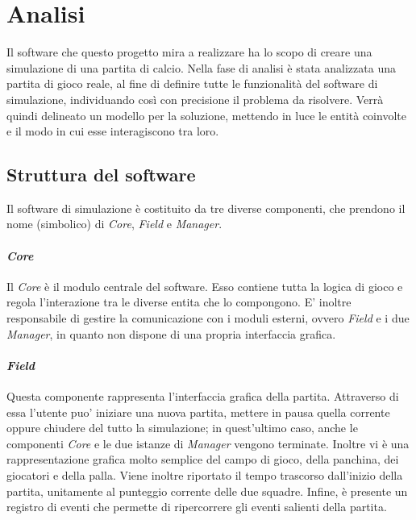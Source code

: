 
\section{Analisi}
\label{sec:analisi}

Il software che questo progetto mira a realizzare ha lo scopo di creare una simulazione di una partita di calcio. Nella fase di analisi è stata analizzata una partita di gioco reale, al fine di definire tutte le funzionalità del software di simulazione, individuando così con precisione il problema da risolvere. Verrà quindi delineato un modello per la soluzione, mettendo in luce le entità coinvolte e il modo in cui esse interagiscono tra loro.

\subsection{Struttura del software}
\label{sec:struttura_del_software}

Il software di simulazione è costituito da tre diverse componenti, che prendono il nome (simbolico) di \textit{Core}, \textit{Field} e \textit{Manager}.

\paragraph{\textit{Core}} \label{sec:struttura_core} Il \textit{Core} è il modulo centrale del software. Esso contiene tutta la logica di gioco e regola l'interazione tra le diverse entita che lo compongono. E' inoltre responsabile di gestire la comunicazione con i moduli esterni, ovvero \textit{Field} e i due \textit{Manager}, in quanto non dispone di una propria interfaccia grafica.

\paragraph{\textit{Field}} \label{sec:struttura_field} Questa componente rappresenta l'interfaccia grafica della partita. Attraverso di essa l'utente puo' iniziare una nuova partita, mettere in pausa quella corrente oppure chiudere del tutto la simulazione; in quest'ultimo caso, anche le componenti \textit{Core} e le due istanze di \textit{Manager} vengono terminate. Inoltre vi è una rappresentazione grafica molto semplice del campo di gioco, della panchina, dei giocatori e della palla. Viene inoltre riportato il tempo trascorso dall'inizio della partita, unitamente al punteggio corrente delle due squadre. Infine, è presente un registro di eventi che permette di ripercorrere gli eventi salienti della partita.

